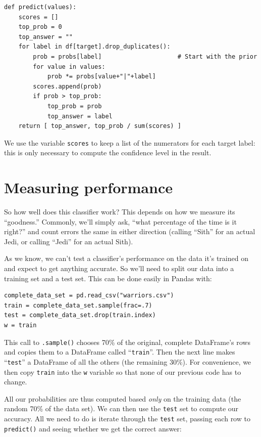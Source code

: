 \begin{Verbatim}[fontsize=\small,samepage=true,frame=single]
def predict(values):
    scores = []
    top_prob = 0
    top_answer = ""
    for label in df[target].drop_duplicates():
        prob = probs[label]                     # Start with the prior
        for value in values:
            prob *= probs[value+"|"+label]
        scores.append(prob)
        if prob > top_prob:
            top_prob = prob
            top_answer = label
    return [ top_answer, top_prob / sum(scores) ]
\end{Verbatim}

We use the variable \texttt{scores} to keep a list of the numerators for each
target label: this is only necessary to compute the confidence level in the
result.

\section{Measuring performance}

So how well does this classifier work? This depends on how we measure its
``goodness.'' Commonly, we'll simply ask, ``what percentage of the time is it
right?'' and count errors the same in either direction (calling ``Sith'' for an
actual Jedi, or calling ``Jedi'' for an actual Sith).

As we know, we can't test a classifier's performance on the data it's trained
on and expect to get anything accurate. So we'll need to split our data into a
training set and a test set. This can be done easily in Pandas with:

\begin{Verbatim}[fontsize=\small,samepage=true,frame=single]
complete_data_set = pd.read_csv("warriors.csv")
train = complete_data_set.sample(frac=.7)
test = complete_data_set.drop(train.index)
w = train
\end{Verbatim}

This call to \texttt{.sample()} chooses 70\% of the original, complete
DataFrame's rows and copies them to a DataFrame called ``\texttt{train}''. Then
the next line makes ``\texttt{test}'' a DataFrame of all the others (the
remaining 30\%). For convenience, we then copy \texttt{train} into the
\texttt{w} variable so that none of our previous code has to change.

All our probabilities are thus computed based \textit{only} on the training
data (the random 70\% of the data set). We can then use the \texttt{test} set
to compute our accuracy. All we need to do is iterate through the
\texttt{test} set, passing each row to \texttt{predict()} and seeing whether
we get the correct answer:

